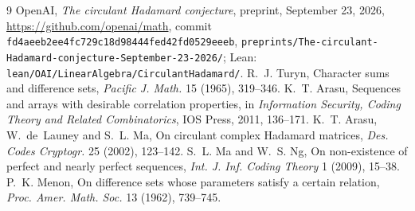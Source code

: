 \documentclass[11pt]{amsart}
\theoremstyle{remark}
\begin{document}
\begin{thebibliography}{9}
 OpenAI, \emph{The circulant Hadamard conjecture}, preprint,
September 23, 2026, \url{https://github.com/openai/math}, commit
\texttt{fd4aeeb2ee4fc729c18d98444fed42fd0529eeeb},
\texttt{preprints/The-circulant-Hadamard-conjecture-September-23-2026/}; Lean:
\texttt{lean/OAI/LinearAlgebra/CirculantHadamard/}.
 R.~J. Turyn, Character sums and difference sets, \emph{Pacific J. Math.} 15 (1965), 319--346.
 K.~T. Arasu, Sequences and arrays with desirable correlation properties, in
\emph{Information Security, Coding Theory and Related Combinatorics}, IOS Press, 2011, 136--171.
 K.~T. Arasu, W.~de~Launey and S.~L. Ma, On circulant complex Hadamard matrices,
\emph{Des. Codes Cryptogr.} 25 (2002), 123--142.
 S.~L. Ma and W.~S. Ng, On non-existence of perfect and nearly perfect sequences,
\emph{Int. J. Inf. Coding Theory} 1 (2009), 15--38.
 P.~K. Menon, On difference sets whose parameters satisfy a certain relation,
\emph{Proc. Amer. Math. Soc.} 13 (1962), 739--745.
\end{thebibliography}
\end{document}
